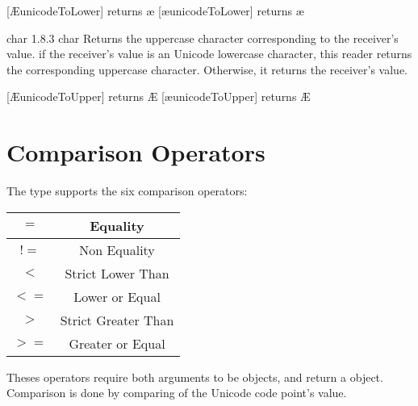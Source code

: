 \exempleDeuxLignes
{}
{[\textquotesingle\AE\textquotesingle unicodeToLower] returns \textquotesingle\ae \textquotesingle}
{[\textquotesingle\ae\textquotesingle unicodeToLower] returns \textquotesingle\ae \textquotesingle}




{char}
{1.8.3}
{char}
{Returns the uppercase character corresponding to the receiver's value.}
{if the receiver's value is an Unicode lowercase character, this reader returns the corresponding uppercase character. Otherwise, it returns the receiver's value.}

\exempleDeuxLignes
{}
{[\textquotesingle\AE\textquotesingle unicodeToUpper] returns \textquotesingle\AE\textquotesingle}
{[\textquotesingle\ae\textquotesingle unicodeToUpper] returns \textquotesingle\AE\textquotesingle}





\section{Comparison Operators}

The  type supports the six comparison operators:\newline

\begin{tabular}{|c|c|}
\hline
$=$ & Equality \\
\hline
$!=$ & Non Equality \\
\hline
$<$  & Strict Lower Than \\
\hline
$<=$  & Lower or Equal \\
\hline
$>$  & Strict Greater Than \\
\hline
$>=$  & Greater or Equal \\
\hline
\end{tabular}

Theses operators require both arguments to be  objects, and return a  object. Comparison is done by comparing of the Unicode code point's value.


